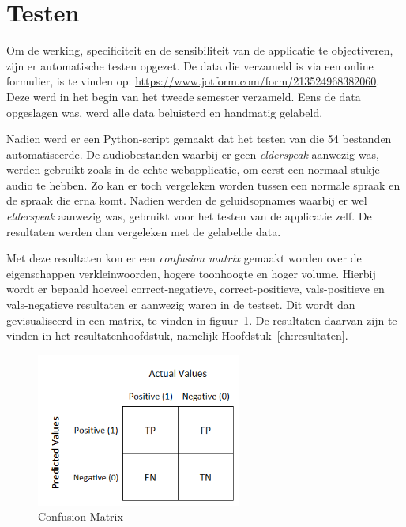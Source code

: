 \section{Testen}
Om de werking, specificiteit en de sensibiliteit van de applicatie te objectiveren, zijn er automatische testen opgezet. De data die verzameld is via een online formulier, is te vinden op:  \url{https://www.jotform.com/form/213524968382060}. Deze werd in het begin van het tweede semester verzameld. Eens de data opgeslagen was, werd alle data beluisterd en handmatig gelabeld.

Nadien werd er een Python-script gemaakt dat het testen van die 54 bestanden automatiseerde. De audiobestanden waarbij er geen \textit{elderspeak} aanwezig was, werden gebruikt zoals in de echte webapplicatie, om eerst een normaal stukje audio te hebben. Zo kan er toch vergeleken worden tussen een normale spraak en de spraak die erna komt. Nadien werden de geluidsopnames waarbij er wel \textit{elderspeak} aanwezig was, gebruikt voor het testen van de applicatie zelf. De resultaten werden dan vergeleken met de gelabelde data.

Met deze resultaten kon er een \textit{confusion matrix} gemaakt worden over  de eigenschappen verkleinwoorden, hogere toonhoogte en hoger volume. Hierbij wordt er bepaald hoeveel correct-negatieve, correct-positieve, vals-positieve en vals-negatieve resultaten er aanwezig waren in de testset. Dit wordt dan gevisualiseerd in een matrix, te vinden in figuur~\ref{fig:confusion_matrix}. De resultaten daarvan zijn te vinden in het resultatenhoofdstuk, namelijk Hoofdstuk~\ref{ch:resultaten}.

\begin{figure}
    \centering
    \includegraphics[width=0.6\textwidth]{./img/confusion_matrix}
    \caption{\label{fig:confusion_matrix} Confusion Matrix~\autocite{Jain2020}}
\end{figure}

